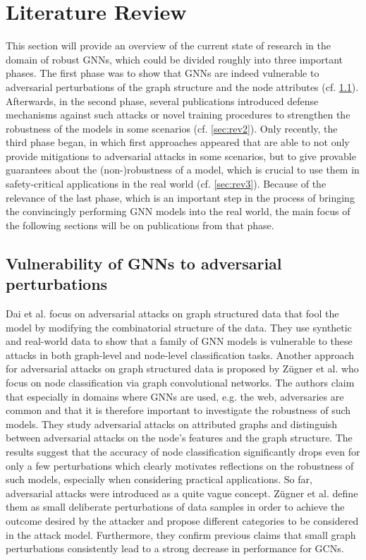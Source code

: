 \documentclass[a4paper,preprint]{sig-alternate}
\begin{document}
\section{Literature Review}
\label{sec:literature}

This section will provide an overview of the current state of research in the domain of robust GNNs, which could be divided
roughly into three important phases.
The first phase was to show that GNNs are indeed vulnerable to adversarial perturbations of the graph structure and the node attributes (cf. \ref{sec:rev1}).
Afterwards, in the second phase, several publications introduced defense mechanisms against such attacks or novel training procedures 
to strengthen the robustness of the models in some scenarios (cf. \ref{sec:rev2}). Only recently, the third phase began, in which first approaches appeared
that are able to not only provide mitigations to adversarial attacks in some scenarios, but to give provable guarantees about the (non-)robustness 
of a model, which is crucial to use them in safety-critical applications in the real world (cf. \ref{sec:rev3}). Because of the relevance of the last phase, 
which is an important step in the process of bringing the convincingly performing GNN models into the real world, the main focus of the following sections
will be on publications from that phase.

\vfill
\pagebreak

\subsection{Vulnerability of GNNs to adversarial perturbations}
\label{sec:rev1}

Dai et al. \cite{Dai_2018} focus on adversarial attacks on graph structured data that fool the model by modifying the
combinatorial structure of the data. They use synthetic and real-world data to show that a family of GNN models is vulnerable
to these attacks in both graph-level and node-level classification tasks.
Another approach for adversarial attacks on graph structured data is proposed by Zügner et al. \cite{Zuegner_2018} who focus on node classification
via graph convolutional networks.
The authors claim that especially in domains where GNNs are used, e.g. the web, adversaries are common and that it is therefore important
to investigate the robustness of such models. They study adversarial attacks on attributed graphs and distinguish between
adversarial attacks on the node's features and the graph structure. The results suggest that the accuracy of node classification
significantly drops even for only a few perturbations which clearly motivates reflections on the robustness of such models, especially
when considering practical applications.
So far, adversarial attacks were introduced as a quite vague concept. Zügner et al. \cite{zuegner2019adversarial}
define them as small deliberate perturbations of data samples in order to achieve the outcome desired by the attacker
and propose different categories to be considered in the attack model. Furthermore, they confirm previous claims that small graph 
perturbations consistently lead to a strong decrease in performance for GCNs.
\end{document}
